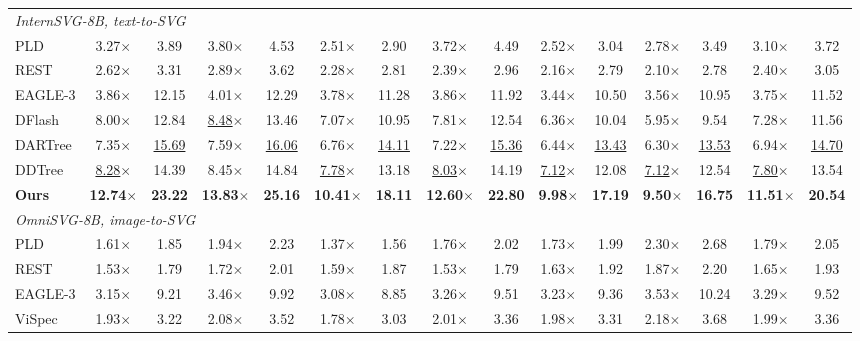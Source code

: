 \begin{table}[t]
\begin{tabular*}{\textwidth}{@{\extracolsep{\fill}}l*{14}{c}@{}}
\midrule
\multicolumn{15}{l}{\textit{InternSVG-8B, text-to-SVG}} \\
PLD & 3.27$\times$ & 3.89 & 3.80$\times$ & 4.53 & 2.51$\times$ & 2.90 & 3.72$\times$ & 4.49 & 2.52$\times$ & 3.04 & 2.78$\times$ & 3.49 & 3.10$\times$ & 3.72 \\
REST & 2.62$\times$ & 3.31 & 2.89$\times$ & 3.62 & 2.28$\times$ & 2.81 & 2.39$\times$ & 2.96 & 2.16$\times$ & 2.79 & 2.10$\times$ & 2.78 & 2.40$\times$ & 3.05 \\
EAGLE-3 & 3.86$\times$ & 12.15 & 4.01$\times$ & 12.29 & 3.78$\times$ & 11.28 & 3.86$\times$ & 11.92 & 3.44$\times$ & 10.50 & 3.56$\times$ & 10.95 & 3.75$\times$ & 11.52 \\
DFlash & 8.00$\times$ & 12.84 & \underline{8.48}$\times$ & 13.46 & 7.07$\times$ & 10.95 & 7.81$\times$ & 12.54 & 6.36$\times$ & 10.04 & 5.95$\times$ & 9.54 & 7.28$\times$ & 11.56 \\
DARTree & 7.35$\times$ & \underline{15.69} & 7.59$\times$ & \underline{16.06} & 6.76$\times$ & \underline{14.11} & 7.22$\times$ & \underline{15.36} & 6.44$\times$ & \underline{13.43} & 6.30$\times$ & \underline{13.53} & 6.94$\times$ & \underline{14.70} \\
DDTree & \underline{8.28}$\times$ & 14.39 & 8.45$\times$ & 14.84 & \underline{7.78}$\times$ & 13.18 & \underline{8.03}$\times$ & 14.19 & \underline{7.12}$\times$ & 12.08 & \underline{7.12}$\times$ & 12.54 & \underline{7.80}$\times$ & 13.54 \\
\textbf{Ours} & \textbf{12.74}$\times$ & \textbf{23.22} & \textbf{13.83}$\times$ & \textbf{25.16} & \textbf{10.41}$\times$ & \textbf{18.11} & \textbf{12.60}$\times$ & \textbf{22.80} & \textbf{9.98}$\times$ & \textbf{17.19} & \textbf{9.50}$\times$ & \textbf{16.75} & \textbf{11.51}$\times$ & \textbf{20.54} \\
\midrule
\multicolumn{15}{l}{\textit{OmniSVG-8B, image-to-SVG}} \\
PLD & 1.61$\times$ & 1.85 & 1.94$\times$ & 2.23 & 1.37$\times$ & 1.56 & 1.76$\times$ & 2.02 & 1.73$\times$ & 1.99 & 2.30$\times$ & 2.68 & 1.79$\times$ & 2.05 \\
REST & 1.53$\times$ & 1.79 & 1.72$\times$ & 2.01 & 1.59$\times$ & 1.87 & 1.53$\times$ & 1.79 & 1.63$\times$ & 1.92 & 1.87$\times$ & 2.20 & 1.65$\times$ & 1.93 \\
EAGLE-3 & 3.15$\times$ & 9.21 & 3.46$\times$ & 9.92 & 3.08$\times$ & 8.85 & 3.26$\times$ & 9.51 & 3.23$\times$ & 9.36 & 3.53$\times$ & 10.24 & 3.29$\times$ & 9.52 \\
ViSpec & 1.93$\times$ & 3.22 & 2.08$\times$ & 3.52 & 1.78$\times$ & 3.03 & 2.01$\times$ & 3.36 & 1.98$\times$ & 3.31 & 2.18$\times$ & 3.68 & 1.99$\times$ & 3.36 \\

\end{tabular*}
\end{table}
